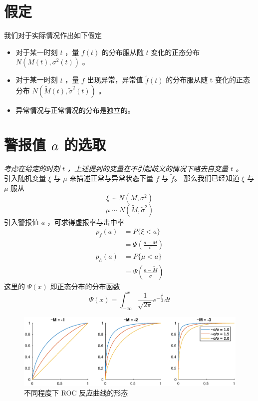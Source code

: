 \documentclass[a4paper]{article}
\begin{document}
\section{假定}
我们对于实际情况作出如下假定
\begin{itemize}
    \item 对于某一时刻 $t$ ，量 $f(t)$ 的分布服从随 $t$ 变化的正态分布 $N(M(t), \sigma^2(t))$ 。
    \item 对于某一时刻 $t$ ，量 $f$ 出现异常，异常值 $\tilde{f}(t)$ 的分布服从随 t 变化的正态分布 $N(\tilde{M}(t), \tilde{\sigma}^2(t))$ 。
    \item 异常情况与正常情况的分布是独立的。
\end{itemize}
\section{警报值 $a$ 的选取}
\emph{考虑在给定的时刻 $t$ ，上述提到的变量在不引起歧义的情况下略去自变量 $t$ 。}
\\
引入随机变量 $\xi$ 与 $\mu$ 来描述正常与异常状态下量 $f$ 与 $\tilde{f}$。
那么我们已经知道 $\xi$ 与 $\mu$ 服从
\begin{equation}
	\label{eqn:det_xi}
	\xi \sim N(M, \sigma^2)
\end{equation}
\begin{equation}
	\label{eqn:det_mu}
	\mu \sim N(\tilde{M}, \tilde{\sigma}^2)
\end{equation}
引入警报值 $a$ ，可求得虚报率与击中率
\begin{align}
	p_f(a) &= P\{\xi < a\} \\
		&= \Psi(\frac{a-M}{\sigma}) \label{eqn:det-p_f}
\end{align}
\begin{align}
	p_h(a) &= P\{\mu < a\} \\
		&= \Psi(\frac{a-\tilde{M}}{\tilde{\sigma}}) \label{eqn:det-p_h}
\end{align}
这里的 $\Psi(x)$ 即正态分布的分布函数
\begin{equation}
	\label{eqn:psi}
	\Psi(x) = \int_{-\infty}^{x} \frac{1}{\sqrt{2\pi}}e^{-\frac{t^2}{2}} dt
\end{equation}
\begin{figure}[htbp]
	\centering
	\includegraphics[scale=0.6]{pic/tilde-M-tilde-sigma.eps}
	\caption{不同程度下 ROC 反应曲线的形态}
    \label{fig:roc}
\end{figure}
\end{document}
